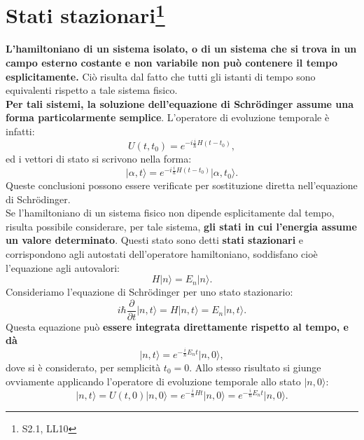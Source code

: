 \documentclass[a4paper,12pt,oneside]{book}
\begin{document}
\section[Stati stazionari]{Stati stazionari\footnote{S2.1, LL10}}
\textbf{L'hamiltoniano di un sistema isolato, o di un sistema che si trova in un campo esterno costante e non variabile non può contenere il tempo esplicitamente.} Ciò risulta dal fatto che tutti gli istanti di tempo sono equivalenti rispetto a tale sistema fisico.\\
\textbf{Per tali sistemi, la soluzione dell'equazione di Schr\"{o}dinger assume una forma particolarmente semplice}. L'operatore di evoluzione temporale è infatti:
\begin{equation}
U(t,t_0)= e^{-i\frac{i}{\hbar}H(t-t_0)},
\end{equation}
ed i vettori di stato si scrivono nella forma:
\begin{equation}
\vert \alpha, t \rangle = e^{-i\frac{i}{\hbar}H(t-t_0)}\vert \alpha, t_0 \rangle.
\end{equation}
Queste conclusioni possono essere verificate per sostituzione diretta nell'equazione di Schr\"{o}dinger.\\
Se l'hamiltoniano di un sistema fisico non dipende esplicitamente dal tempo, risulta possibile considerare, per tale sistema, \textbf{gli stati in cui l'energia assume un valore determinato}. Questi stato sono detti \textbf{stati stazionari} e corrispondono agli autostati dell'operatore hamiltoniano, soddisfano cioè l'equazione agli autovalori:
\begin{equation}
H|n\rangle = E_n |n \rangle.
\end{equation}
Consideriamo l'equazione di Schr\"{o}dinger per uno stato stazionario:
\begin{equation}
i\hbar \frac{\partial}{\partial t}|n,t\rangle = H |n,t \rangle = E_n |n, t \rangle.
\end{equation}
Questa equazione può \textbf{essere integrata direttamente rispetto al tempo, e dà}
\begin{equation}
|n,t\rangle = e^{-\frac{i}{\hbar}E_n t}\vert n, 0\rangle,
\label{eq:cap8_4}
\end{equation}
dove si è considerato, per semplicità $t_0=0$. Allo stesso risultato si giunge ovviamente applicando l'operatore di evoluzione temporale allo stato $\vert n, 0\rangle$:
\begin{equation}
\vert n, t \rangle = U(t,0) \vert n, 0 \rangle = e^{-\frac{i}{\hbar}H t}\vert n, 0\rangle= e^{-\frac{i}{\hbar}E_n t}\vert n, 0\rangle.
\end{equation}
\end{document}
